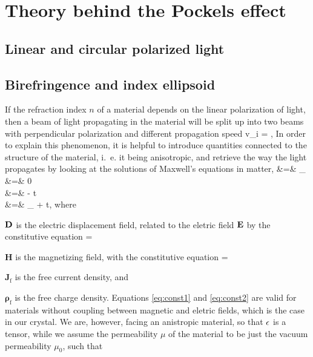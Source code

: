 \section{Theory behind the Pockels effect}

\subsection{Linear and circular polarized light}

\subsection{Birefringence and index ellipsoid}
If the refraction index $n$ of a material depends on the linear polarization of light, 
then a beam of light propagating in the material will be split up into 
two beams with perpendicular polarization and different propagation speed 
\beq
   v_i = , 
\eeq
In order to explain this phenomenon, it is helpful to introduce quantities 
connected to the structure of the material, i.~e. it being anisotropic, 
and retrieve the way the light propagates by looking at the solutions 
of Maxwell's equations in matter, 
\bea
\nabla \cdot \D &=& \rho_ 
\label{eq:max1} \\ 
\nabla \cdot \B &=& 0
\label{eq:max2} \\ 
\nabla \times \E &=& -\frac{\partial \B} {\partial t}
\label{eq:max3} \\ 
    \nabla \times {} &=& _ + 
        \frac{\partial \D} {\partial t}, 
\label{eq:max4}
\eea
where 
\bit
\item $\mathbf{D}$ is the electric displacement field, related to the eletric field $\mathbf{E}$ 
    by the constitutive equation 
    \beq
        \D = \eps \E 
    \label{eq:const1}
    \eeq
\item $\mathbf{H}$ is the magnetizing field, with the constitutive equation 
    \beq
         = \mu \B
    \label{eq:const2}
    \eeq
\item $\mathbf{J}_\text{f}$ is the free current density, and
\item $\mathbf{\rho}_\text{f}$ is the free charge density.
\eit
Equations \eqref{eq:const1} and \eqref{eq:const2} are valid for materials without 
coupling between magnetic and eletric fields, which is the case in our 
crystal. We are, however, facing an anistropic material, so that 
$\mathbf{\epsilon}$ is a tensor, while we assume the permeability $\mu$ of the material 
to be just the vacuum permeability $\mu_0$, such that
